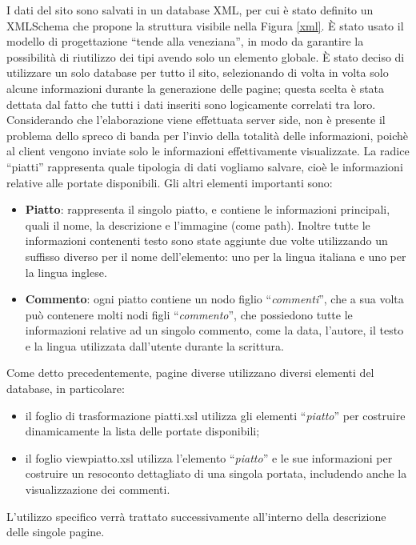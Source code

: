 \documentclass[10pt,a4paper,onecolumn]{article}
\begin{document}
I dati del sito sono salvati in un database XML, per cui è stato definito un XMLSchema che propone la struttura visibile nella Figura \ref{xml}. È stato usato il modello di progettazione ``tende alla veneziana'', in modo da garantire la possibilità di riutilizzo dei tipi avendo solo un elemento globale. 
È stato deciso di utilizzare un solo database per tutto il sito, selezionando di volta in volta solo alcune informazioni durante la generazione delle pagine; questa scelta è stata dettata dal fatto che tutti i dati inseriti sono logicamente correlati tra loro.
Considerando che l'elaborazione viene effettuata server side, non è presente il problema dello spreco di banda per l'invio della totalità delle informazioni, poichè al client vengono inviate solo le informazioni effettivamente visualizzate.
La radice ``piatti'' rappresenta quale tipologia di dati vogliamo salvare, cioè le informazioni relative alle portate disponibili.
Gli altri elementi importanti sono:
\begin{itemize}
 \item \textbf{Piatto}: rappresenta il singolo piatto, e contiene le informazioni principali, quali il nome, la descrizione e l'immagine (come path). Inoltre tutte le informazioni contenenti testo sono state aggiunte due volte utilizzando un suffisso diverso per il nome dell'elemento: uno per la lingua italiana e uno per la lingua inglese.
 \item \textbf{Commento}: ogni piatto contiene un nodo figlio ``\textit{commenti}'', che a sua volta può contenere molti nodi figli ``\textit{commento}'', che possiedono tutte le informazioni relative ad un singolo commento, come la data, l'autore, il testo e la lingua utilizzata dall'utente durante la scrittura.
\end{itemize}
Come detto precedentemente, pagine diverse utilizzano diversi elementi del database, in particolare:
\begin{itemize}
 \item il foglio di trasformazione piatti.xsl utilizza gli elementi ``\textit{piatto}'' per costruire dinamicamente la lista delle portate disponibili;
 \item il foglio viewpiatto.xsl utilizza l'elemento ``\textit{piatto}'' e le sue informazioni per costruire un resoconto dettagliato di una singola portata, includendo anche la visualizzazione dei commenti.
\end{itemize}
L'utilizzo specifico verrà trattato successivamente all'interno della descrizione delle singole pagine.
\end{document}
